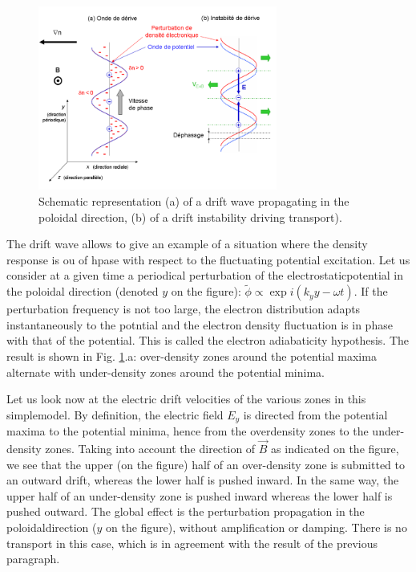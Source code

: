 				
\begin{figure}[htbp]
	\centering
		\includegraphics[width=0.70\textwidth]{Fig_onde_de_derive.png}
	\caption{Schematic representation (a) of a drift wave propagating in the poloidal direction, (b) of a drift instability driving transport).}
	\label{fig:onde_de_derive}
\end{figure}

The drift wave allows to give an example of a situation where the density response is ou of hpase with respect to the fluctuating potential excitation. Let us consider at a given time a periodical perturbation of the electrostaticpotential in the poloidal direction (denoted $y$ on the figure): $\tilde{\phi} \propto \exp{i \left( k_y y - \omega t \right)}$. If the perturbation frequency is not too large, the electron distribution adapts instantaneously to the potntial and the electron density fluctuation is in phase with that of the potential. This is called the electron adiabaticity hypothesis. The result is shown in Fig. \ref{fig:onde_de_derive}.a: over-density zones around the potential maxima alternate with under-density zones around the potential minima.
				
Let us look now at the electric drift velocities of the various zones in this simplemodel. By definition, the electric field $E_y$ is directed from the potential maxima to the potential minima, hence from the overdensity zones to the under-density zones. Taking into account the direction of $\vec{B}$ as indicated on the figure, we see that the upper (on the figure) half of an over-density zone is submitted to an outward drift, whereas the lower half is pushed inward. In the same way, the upper half of an under-density zone is pushed inward whereas the lower half is pushed outward. The global effect is the perturbation propagation in the poloidaldirection ($y$ on the figure), without amplification or damping. There is no transport in this case, which is in agreement with the result of the previous paragraph.

